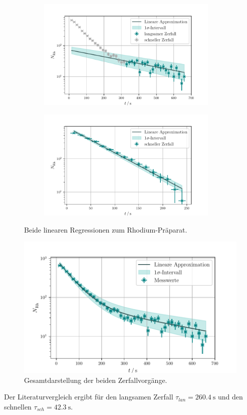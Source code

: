 \begin{figure}
    \begin{subfigure}{0.5\textwidth}
        \includegraphics[width=0.95\textwidth]{plots/Rhodium_langsam.pdf}
    \end{subfigure}
    \begin{subfigure}{0.5\textwidth}
        \includegraphics[width=0.95\textwidth]{plots/Rhodium_schnell.pdf}
    \end{subfigure}
    \caption{Beide linearen Regressionen zum Rhodium-Präparat.}
    \label{fig:RHlin}
\end{figure}
\begin{figure}
    \centering
    \includegraphics[width=\textwidth]{python/Rhodium_kombi.pdf}
    \caption{Gesamtdarstellung der beiden Zerfallvorgänge.}
    \label{fig:Rhodium_kombi}
\end{figure}

Der Literaturvergleich\cite{RhIsotopes} ergibt für den langsamen Zerfall $\tau_{lan} = \SI{260.4}{\second}$ und den schnellen $\tau_{sch} = \SI{42.3}{\second}$.